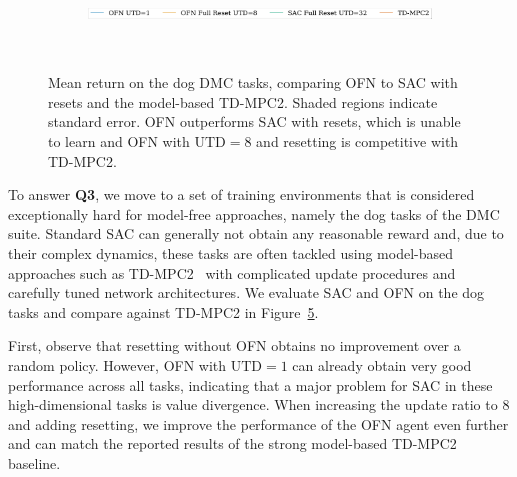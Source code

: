 \begin{figure}[t]
\centering
    \begin{subfigure}[b]{0.8\textwidth}
        \centering
        \includegraphics[height=0.4cm]{figures/dissecting/dog_exp/dog_legend.pdf}
    \end{subfigure}\\%
    \begin{subfigure}[t]{0.25\textwidth}
        \centering
        \label{subfig:overestimation:dog_stand}
    \end{subfigure}%
    \begin{subfigure}[t]{0.25\textwidth}
        \centering
        \label{subfig:overestimation:dog_walk}
    \end{subfigure}%
    \begin{subfigure}[t]{0.25\textwidth}
    \centering
        \label{subfig:overestimation:dog_trot}
    \end{subfigure}%
    \begin{subfigure}[t]{0.25\textwidth}
        \centering
        \label{subfig:overestimation:dog_run}
    \end{subfigure}%
    \caption{Mean return on the dog DMC tasks, comparing OFN to SAC with resets and the model-based TD-MPC2. Shaded regions indicate standard error. OFN outperforms SAC with resets, which is unable to learn and OFN with $\mathrm{UTD}=8$ and resetting is competitive with TD-MPC2.}
    \label{fig:overestimation:all_dog}
\end{figure}

To answer \textbf{Q3}, we move to a set of training environments that is considered exceptionally hard for model-free approaches, namely the dog tasks of the DMC suite. Standard SAC can generally not obtain any reasonable reward and, due to their complex dynamics, these tasks are often tackled using model-based approaches such as TD-MPC2~\parencite{hansen2024tdmpc} with complicated update procedures and carefully tuned network architectures. We evaluate SAC and OFN on the dog tasks and compare against TD-MPC2 in Figure~\ref{fig:overestimation:all_dog}.

First, observe that resetting without OFN obtains no improvement over a random policy. However, OFN with $\mathrm{UTD}=1$ can already obtain very good performance across all tasks, indicating that a major problem for SAC in these high-dimensional tasks is value divergence. When increasing the update ratio to $8$ and adding resetting, we improve the performance of the OFN agent even further and can match the reported results of the strong model-based TD-MPC2 baseline. 

